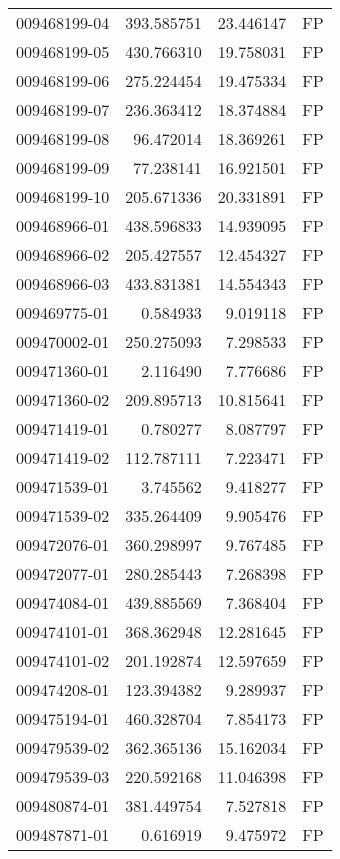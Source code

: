 \begin{tabular}{lrrl}
009468199-04 &  393.585751 &    23.446147 &   FP \\
009468199-05 &  430.766310 &    19.758031 &   FP \\
009468199-06 &  275.224454 &    19.475334 &   FP \\
009468199-07 &  236.363412 &    18.374884 &   FP \\
009468199-08 &   96.472014 &    18.369261 &   FP \\
009468199-09 &   77.238141 &    16.921501 &   FP \\
009468199-10 &  205.671336 &    20.331891 &   FP \\
009468966-01 &  438.596833 &    14.939095 &   FP \\
009468966-02 &  205.427557 &    12.454327 &   FP \\
009468966-03 &  433.831381 &    14.554343 &   FP \\
009469775-01 &    0.584933 &     9.019118 &   FP \\
009470002-01 &  250.275093 &     7.298533 &   FP \\
009471360-01 &    2.116490 &     7.776686 &   FP \\
009471360-02 &  209.895713 &    10.815641 &   FP \\
009471419-01 &    0.780277 &     8.087797 &   FP \\
009471419-02 &  112.787111 &     7.223471 &   FP \\
009471539-01 &    3.745562 &     9.418277 &   FP \\
009471539-02 &  335.264409 &     9.905476 &   FP \\
009472076-01 &  360.298997 &     9.767485 &   FP \\
009472077-01 &  280.285443 &     7.268398 &   FP \\
009474084-01 &  439.885569 &     7.368404 &   FP \\
009474101-01 &  368.362948 &    12.281645 &   FP \\
009474101-02 &  201.192874 &    12.597659 &   FP \\
009474208-01 &  123.394382 &     9.289937 &   FP \\
009475194-01 &  460.328704 &     7.854173 &   FP \\
009479539-02 &  362.365136 &    15.162034 &   FP \\
009479539-03 &  220.592168 &    11.046398 &   FP \\
009480874-01 &  381.449754 &     7.527818 &   FP \\
009487871-01 &    0.616919 &     9.475972 &   FP \\

\end{tabular}
